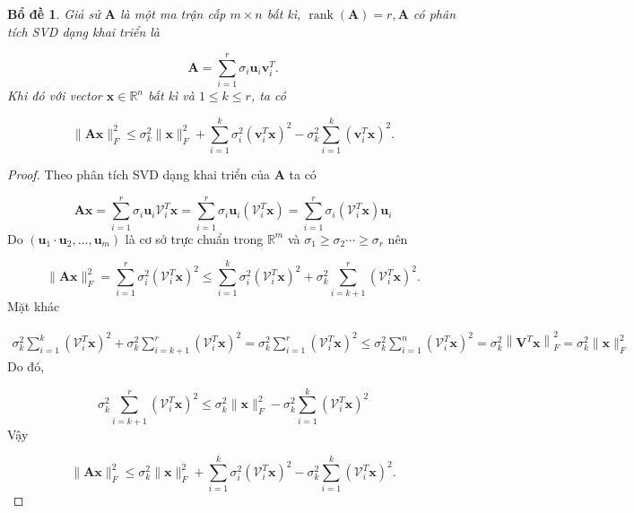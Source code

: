 \documentclass[12pt,a4paper,oneside]{report}
\newtheorem{bd}{Bổ đề} [section]
\numberwithin{equation}{section}
\begin{document}
\begin{bd} \label{bode} Giả sử $\mathbf{A}$ là một ma trận cấp $m \times n$ bất kì, $\operatorname{rank}(\mathbf{A})=r, \mathbf{A}$ có phân tích SVD dạng khai triển là

$$
\mathbf{A}=\sum_{i=1}^{r} \sigma_{i} \mathbf{u}_{i} \mathbf{v}_{i}^{T} .
$$
Khi đó với vector $\mathbf{x} \in \mathbb{R}^{n}$ bất kì và $1 \leqslant k \leqslant r$, ta có

$$
\|\mathbf{A} \mathbf{x}\|_{F}^{2} \leqslant \sigma_{k}^{2}\|\mathbf{x}\|_{F}^{2}+\sum_{i=1}^{k} \sigma_{i}^{2}\left(\mathbf{v}_{i}^{T} \mathbf{x}\right)^{2}-\sigma_{k}^{2} \sum_{i=1}^{k}\left(\mathbf{v}_{i}^{T} \mathbf{x}\right)^{2} .
$$
\end{bd}
\begin{proof}
Theo phân tích SVD dạng khai triển của $\mathbf{A}$ ta có

$$
\mathbf{A} \mathbf{x}=\sum_{i=1}^{r} \sigma_{i} \mathbf{u}_{i} \mathcal{V}_{i}^{T} \mathbf{x}=\sum_{i=1}^{r} \sigma_{i} \mathbf{u}_{i}\left(\mathcal{V}_{i}^{T} \mathbf{x}\right)=\sum_{i=1}^{r} \sigma_{i}\left(\mathcal{V}_{i}^{T} \mathbf{x}\right) \mathbf{u}_{i}
$$
Do $\left(\mathbf{u}_{1} \cdot \mathbf{u}_{2}, \ldots, \mathbf{u}_{m}\right)$ là cơ sở trực chuẩn trong $\mathbb{R}^{m}$ và $\sigma_{1} \geqslant \sigma_{2} \cdots \geqslant \sigma_{r}$ nên

$$
\|\mathbf{A} \mathbf{x}\|_{F}^{2}=\sum_{i=1}^{r} \sigma_{i}^{2}\left(\mathcal{V}_{i}^{T} \mathbf{x}\right)^{2} \leqslant \sum_{i=1}^{k} \sigma_{i}^{2}\left(\mathcal{V}_{i}^{T} \mathbf{x}\right)^{2}+\sigma_{k}^{2} \sum_{i=k+1}^{r}\left(\mathcal{V}_{i}^{T} \mathbf{x}\right)^{2} .
$$
Mặt khác

\begin{equation}
	\begin{aligned}
\sigma_{k}^{2} \sum_{i=1}^{k}\left(\mathcal{V}_{i}^{T} \mathbf{x}\right)^{2}+\sigma_{k}^{2} \sum_{i=k+1}^{r}\left(\mathcal{V}_{i}^{T} \mathbf{x}\right)^{2}=\sigma_{k}^{2} \sum_{i=1}^{r}\left(\mathcal{V}_{i}^{T} \mathbf{x}\right)^{2} \leqslant \sigma_{k}^{2} \sum_{i=1}^{n}\left(\mathcal{V}_{i}^{T} \mathbf{x}\right)^{2}=\sigma_{k}^{2}\left\|\mathbf{V}^{T} \mathbf{x}\right\|_{F}^{2}=\sigma_{k}^{2}\|\mathbf{x}\|_{F}^{2}
\end{aligned}
\end{equation}
Do đó,

$$
\sigma_{k}^{2} \sum_{i=k+1}^{r}\left(\mathcal{V}_{i}^{T} \mathbf{x}\right)^{2} \leqslant \sigma_{k}^{2}\|\mathbf{x}\|_{F}^{2}-\sigma_{k}^{2} \sum_{i=1}^{k}\left(\mathcal{V}_{i}^{T} \mathbf{x}\right)^{2}
$$
Vậy

$$
\|\mathbf{A} \mathbf{x}\|_{F}^{2} \leqslant \sigma_{k}^{2}\|\mathbf{x}\|_{F}^{2}+\sum_{i=1}^{k} \sigma_{i}^{2}\left(\mathcal{V}_{i}^{T} \mathbf{x}\right)^{2}-\sigma_{k}^{2} \sum_{i=1}^{k}\left(\mathcal{V}_{i}^{T} \mathbf{x}\right)^{2} .
$$
\end{proof}
\end{document}
